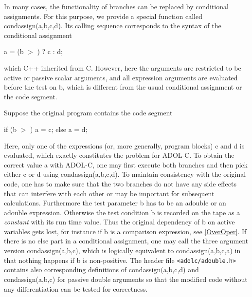 \documentclass[11pt,twoside]{article}
\begin{document}
In many cases, the functionality of branches 
can be replaced by conditional assignments.  
For this purpose, we provide a special function called
{\sf condassign(a,b,c,d)}. Its calling sequence corresponds to the 
syntax of the conditional assignment
\begin{center}
    {\sf a = (b \boldmath $>$ ) ? c : d;}  
\end{center}
which C++ inherited from C. However, here the arguments are restricted to be
active or passive scalar arguments, and all expression arguments
are evaluated before the test on {\sf  b}, which is different from
the usual conditional assignment or the code segment.

Suppose the original program contains the code segment
\begin{center}
{\sf if (b \boldmath $>$ ) a = c; else a = d;}\\
\end{center}
Here, only one of the expressions (or, more generally, program blocks)
{\sf c} and {\sf d} is evaluated, which exactly constitutes the problem
for ADOL-C. To obtain the correct value {\sf a} with ADOL-C, one
may first execute both branches and then pick either {\sf c}
or {\sf d} using 
{\sf condassign(a,b,c,d)}. To maintain
consistency with the original code, one has to make sure
that the two branches do not have any side effects that can
interfere with each other or may be important for subsequent
calculations. Furthermore the test parameter {\sf b} has to be an 
{\sf adouble} or an {\sf adouble} expression. Otherwise the 
test condition {\sf b} is recorded on the tape as a {\em constant} with its
run time value. Thus the original dependency of {\sf b} on 
active variables gets lost, for instance if {\sf b} is a comparison 
expression, see \autoref{OverOper}. 
If there is no {\sf else} part in a conditional assignment, one may call
the three argument version 
{\sf condassign(a,b,c)}, which 
is logically equivalent to {\sf condassign(a,b,c,a)} in that
nothing happens if {\sf b} is non-positive.  
The header file \verb=<adolc/adouble.h>=
contains also corresponding definitions of
{\sf condassign(a,b,c,d)} 
and {\sf condassign(a,b,c)} for
passive {\sf double} arguments so that the modified code 
without any differentiation can be tested
for correctness. 
%
\end{document}
